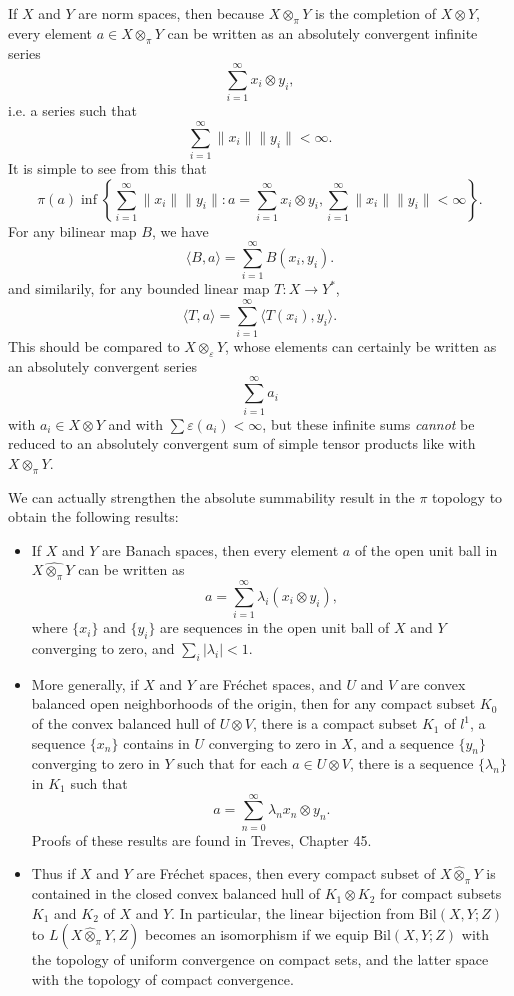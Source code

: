 If $X$ and $Y$ are norm spaces, then because $X \otimes_\pi Y$ is the completion of $X \otimes Y$, every element $a \in X \otimes_\pi Y$ can be written as an absolutely convergent infinite series
%
\[ \sum_{i = 1}^\infty x_i \otimes y_i, \]
%
i.e. a series such that
%
\[ \sum_{i = 1}^\infty \| x_i \| \| y_i \| < \infty. \]
%
It is simple to see from this that
%
\[ \pi(a) \inf \left\{ \sum_{i = 1}^\infty \| x_i \| \| y_i \| : a = \sum_{i = 1}^\infty x_i \otimes y_i, \sum_{i = 1}^\infty \| x_i \| \| y_i \| < \infty \right\}. \]
%
For any bilinear map $B$, we have
%
\[ \langle B, a \rangle = \sum_{i = 1}^\infty B(x_i,y_i). \]
%
and similarily, for any bounded linear map $T: X \to Y^*$,
%
\[ \langle T, a \rangle = \sum_{i = 1}^\infty \langle T(x_i), y_i \rangle. \]
%
This should be compared to $X \otimes_\varepsilon Y$, whose elements can certainly be written as an absolutely convergent series
%
\[ \sum_{i = 1}^\infty a_i \]
%
with $a_i \in X \otimes Y$ and with $\sum \varepsilon(a_i) < \infty$, but these infinite sums \emph{cannot} be reduced to an absolutely convergent sum of simple tensor products like with $X \otimes_\pi Y$.

\begin{remark}
    We can actually strengthen the absolute summability result in the $\pi$ topology to obtain the following results:
    \begin{itemize}
        \item If $X$ and $Y$ are Banach spaces, then every element $a$ of the open unit ball in $X \widehat{\otimes_\pi} Y$ can be written as
        \[ a = \sum_{i = 1}^\infty \lambda_i (x_i \otimes y_i), \]
        where $\{ x_i \}$ and $\{ y_i \}$ are sequences in the open unit ball of $X$ and $Y$ converging to zero, and $\sum_i |\lambda_i| < 1$.

        \item More generally, if $X$ and $Y$ are Fr\'{e}chet spaces, and $U$ and $V$ are convex balanced open neighborhoods of the origin, then for any compact subset $K_0$ of the convex balanced hull of $U \otimes V$, there is a compact subset $K_1$ of $l^1$, a sequence $\{ x_n \}$ contains in $U$ converging to zero in $X$, and a sequence $\{ y_n \}$ converging to zero in $Y$ such that for each $a \in U \otimes V$, there is a sequence $\{ \lambda_n \}$ in $K_1$ such that
        \[ a = \sum_{n = 0}^\infty \lambda_n x_n \otimes y_n. \]
        Proofs of these results are found in Treves, Chapter 45.

        \item Thus if $X$ and $Y$ are Fr\'{e}chet spaces, then every compact subset of $X \widehat{\otimes}_\pi Y$ is contained in the closed convex balanced hull of $K_1 \otimes K_2$ for compact subsets $K_1$ and $K_2$ of $X$ and $Y$. In particular, the linear bijection from $\text{Bil}(X,Y;Z)$ to $L(X \widehat{\otimes}_\pi Y, Z)$ becomes an isomorphism if we equip $\text{Bil}(X,Y;Z)$ with the topology of uniform convergence on compact sets, and the latter space with the topology of compact convergence.
    \end{itemize}
 \end{remark}

